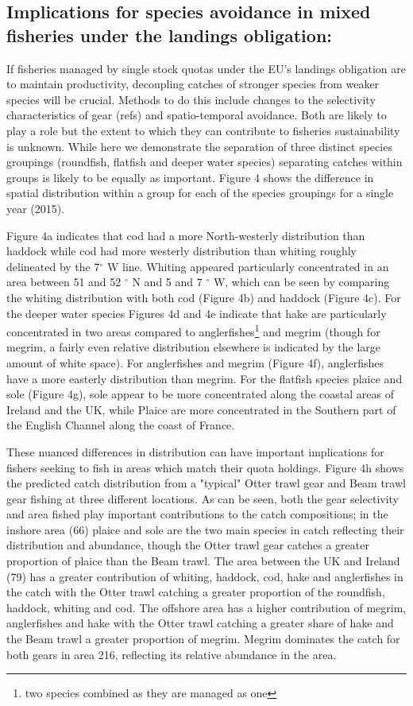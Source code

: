 \documentclass{nature}
\begin{document}
\begin{linenumbers}
[291 words]


\subsection{Implications for species avoidance in mixed fisheries under the
	landings obligation:}
If fisheries managed by single stock quotas under the EU's landings obligation
are to maintain productivity, decoupling catches of stronger species from weaker
species will be crucial.  Methods to do this include changes to the selectivity
characteristics of gear (refs) and spatio-temporal avoidance. Both are likely
to play a role but the extent to which they can contribute to fisheries
sustainability is unknown. While here we demonstrate the separation of three
distinct species groupings (roundfish, flatfish and deeper water species)
separating catches within groups is likely to be equally as important. Figure 4 shows
the difference in spatial distribution within a group for each of the species
groupings for a single year (2015). 

Figure 4a indicates that cod had a more North-westerly distribution than
haddock while cod had more westerly distribution than whiting roughly
delineated by the 7$^{\circ}$ W line. Whiting appeared particularly
concentrated in an area between 51 and 52 $^{\circ}$ N and 5 and 7 $^{\circ}$
W, which can be seen by comparing the whiting distribution with both cod
(Figure 4b) and haddock (Figure 4c). For the deeper water species Figures 4d and 4e
indicate that hake are particularly concentrated in two areas compared to
anglerfishes\footnote{two species combined as they are managed as one} and
megrim (though for megrim, a fairly even relative distribution elsewhere is
indicated by the large amount of white space). For anglerfishes and megrim
(Figure 4f), anglerfishes have a more easterly distribution than megrim. For
the flatfish species plaice and sole (Figure 4g), sole appear to be more
concentrated along the coastal areas of Ireland and the UK, while Plaice are
more concentrated in the Southern part of the English Channel along the coast
of France.

These nuanced differences in distribution can have important implications for
fishers seeking to fish in areas which match their quota holdings. Figure 4h
shows the predicted catch distribution from a "typical" Otter trawl gear and
Beam trawl gear fishing at three different locations. As can be seen, both the
gear selectivity and area fished play important contributions to the catch
compositions; in the inshore area (66) plaice and sole are the two main species
in catch reflecting their distribution and abundance, though the Otter trawl
gear catches a greater proportion of plaice than the Beam trawl. The area
between the UK and Ireland (79) has a greater contribution of whiting, haddock,
cod, hake and anglerfishes in the catch with the Otter trawl catching a greater
proportion of the roundfish, haddock, whiting and cod. The offshore area has a
higher contribution of megrim, anglerfishes and hake with the Otter trawl
catching a greater share of hake and the Beam trawl a greater proportion of
megrim. Megrim dominates the catch for both gears in area 216, reflecting its
relative abundance in the area.


\end{linenumbers}
\end{document}
